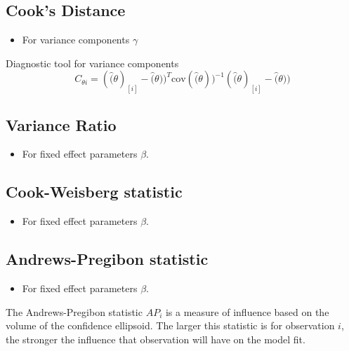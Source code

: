 \documentclass[12pt, a4paper]{report}
\theoremstyle{plain}
\theoremstyle{definition}
\theoremstyle{remark}
\begin{document}
	
	\subsection{Cook's Distance} %
	\begin{itemize}
		\item For variance components $\gamma$
	\end{itemize}
	
	Diagnostic tool for variance components
	\[ C_{\theta i} =(\hat(\theta)_{[i]} - \hat(\theta))^{T}\mbox{cov}( \hat(\theta))^{-1}(\hat(\theta)_{[i]} - \hat(\theta))\]
	
	
	\subsection{Variance Ratio} %
	\begin{itemize}
		\item For fixed effect parameters $\beta$.
	\end{itemize}
	
	
	\subsection{Cook-Weisberg statistic} %
	\begin{itemize}
		\item For fixed effect parameters $\beta$.
	\end{itemize}
	
	\subsection{Andrews-Pregibon statistic} %
	\begin{itemize}
		\item For fixed effect parameters $\beta$.
	\end{itemize}
	The Andrews-Pregibon statistic $AP_{i}$ is a measure of influence based on the volume of the confidence ellipsoid.
	The larger this statistic is for observation $i$, the stronger the influence that observation will have on the model fit.
	
	
	
	
\end{document}
